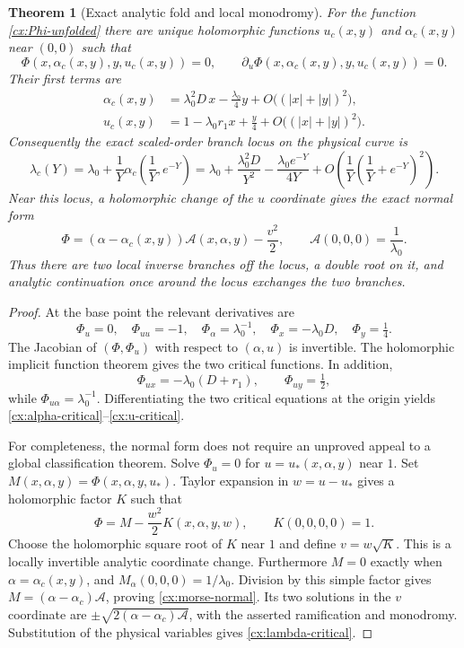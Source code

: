 \documentclass[11pt,a4paper]{article}
\numberwithin{equation}{section}
\newtheorem{theorem}{Theorem}[section]
\theoremstyle{definition}
\theoremstyle{remark}
\begin{document}
\begin{theorem}[Exact analytic fold and local monodromy]
\label{cx:exact-fold}
For the function \eqref{cx:Phi-unfolded} there are unique holomorphic
functions $u_c(x,y)$ and $\alpha_c(x,y)$ near $(0,0)$ such that
\[
 \Phi(x,\alpha_c(x,y),y,u_c(x,y))=0,
 \qquad
 \partial_u\Phi(x,\alpha_c(x,y),y,u_c(x,y))=0.
\]
Their first terms are
\begin{align}
 \alpha_c(x,y)&=\lambda_0^2D\,x-\frac{\lambda_0}4y
               +O\bigl((|x|+|y|)^2\bigr),\label{cx:alpha-critical}\\
 u_c(x,y)&=1-\lambda_0r_1x+\frac y4
               +O\bigl((|x|+|y|)^2\bigr).\label{cx:u-critical}
\end{align}
Consequently the exact scaled-order branch locus on the physical curve is
\begin{equation}\label{cx:lambda-critical}
 \lambda_c(Y)=\lambda_0+
       \frac1Y\alpha_c\!\left(\frac1Y,e^{-Y}\right)
 =\lambda_0+\frac{\lambda_0^2D}{Y^2}
       -\frac{\lambda_0e^{-Y}}{4Y}
       +O\!\left(\frac1Y\left(\frac1Y+e^{-Y}\right)^2\right).
\end{equation}
Near this locus, a holomorphic change of the $u$ coordinate gives the
exact normal form
\begin{equation}\label{cx:morse-normal}
 \Phi=(\alpha-\alpha_c(x,y))\mathcal A(x,\alpha,y)-\frac{v^2}{2},
 \qquad \mathcal A(0,0,0)=\frac1{\lambda_0}.
\end{equation}
Thus there are two local inverse branches off the locus, a double root
on it, and analytic continuation once around the locus exchanges the two
branches.
\end{theorem}

\begin{proof}
At the base point the relevant derivatives are
\[
 \Phi_u=0,\quad \Phi_{uu}=-1,\quad
 \Phi_\alpha=\lambda_0^{-1},\quad
 \Phi_x=-\lambda_0D,\quad \Phi_y=\tfrac14.
\]
The Jacobian of $(\Phi,\Phi_u)$ with respect to $(\alpha,u)$ is
invertible.  The holomorphic implicit function theorem gives the two
critical functions.  In addition,
\[
 \Phi_{ux}=-\lambda_0(D+r_1),\qquad
 \Phi_{uy}=\tfrac12,
\]
while $\Phi_{u\alpha}=\lambda_0^{-1}$.  Differentiating the two
critical equations at the origin yields
\eqref{cx:alpha-critical}--\eqref{cx:u-critical}.

For completeness, the normal form does not require an unproved appeal to
a global classification theorem.  Solve $\Phi_u=0$ for
$u=u_*(x,\alpha,y)$ near $1$.  Set
$M(x,\alpha,y)=\Phi(x,\alpha,y,u_*)$.  Taylor expansion in
$w=u-u_*$ gives a holomorphic factor $K$ such that
\[
 \Phi=M-\frac{w^2}{2}K(x,\alpha,y,w),\qquad K(0,0,0,0)=1.
\]
Choose the holomorphic square root of $K$ near $1$ and define
$v=w\sqrt K$.  This is a locally invertible analytic coordinate change.
Furthermore $M=0$ exactly when $\alpha=\alpha_c(x,y)$, and
$M_\alpha(0,0,0)=1/\lambda_0$.  Division by this simple factor gives
$M=(\alpha-\alpha_c)\mathcal A$, proving
\eqref{cx:morse-normal}.  Its two solutions in the $v$ coordinate are
$\pm\sqrt{2(\alpha-\alpha_c)\mathcal A}$, with the asserted
ramification and monodromy.  Substitution of the physical variables gives
\eqref{cx:lambda-critical}.
\end{proof}
\end{document}
